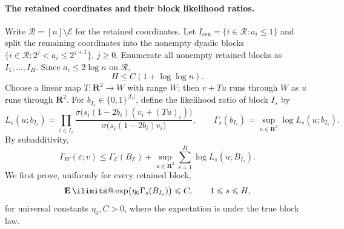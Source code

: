 \documentclass[11pt, letterpaper, hidelinks]{article}
\makeatletter
\renewcommand{\proofname}{\textit{\textbf{Proof}}}
\renewenvironment{proof}[1][\proofname]{\par\pushQED{\qed}\normalfont \topsep6\p@\@plus6\p@\relax\trivlist\item[\hskip\labelsep#1\@addpunct{}]\ignorespaces}{\popQED\endtrivlist\@endpefalse}
\newcommand{\proofsketchname}{\textit{\textbf{Proof sketch}}}
\newenvironment{proofsketch}
  {\begin{proof}[\proofsketchname]}
  {\end{proof}}
\newcommand{\R}{\mathbf R}
\newcommand{\1}{\mathbf 1}
\newcommand{\eps}{\varepsilon}
\renewcommand{\leq}{\leqslant}
\renewcommand{\geq}{\geqslant}
\newcommand{\E}{\operatorname*{\mathbf{E}}\ilimits@}
\theoremstyle{plain}
\theoremstyle{definition}
\makeatother
\begin{document}
\begin{proofsketch}
\paragraph{The retained coordinates and their block likelihood ratios.}
Write $\mathcal R=[n]\setminus\mathcal E$ for the retained coordinates.  Let
$I_{\mathrm{cen}}=\{i\in\mathcal R:a_i\leq1\}$ and split the remaining
coordinates into the nonempty dyadic blocks
$\{i\in\mathcal R:2^j<a_i\leq2^{j+1}\}$, $j\geq0$.  Enumerate all nonempty
retained blocks as $I_1,\ldots,I_H$.  Since $a_i\leq2\log n$ on $\mathcal R$,
\begin{equation}
\label{eq:d2-sketch-block-count}
H\leq C(1+\log\log n).
\end{equation}
Choose a linear map $T:\R^2\to W$ with range $W$; then $v+Tu$ runs through
$W$ as $u$ runs through $\R^2$.
For $b_{I_s}\in\{0,1\}^{|I_s|}$, define the likelihood ratio of block $I_s$ by
\[
L_s(u;b_{I_s})
=\prod_{i\in I_s}
\frac{\sigma\bigl(s_i(1-2b_i)(v_i+(Tu)_i)\bigr)}
{\sigma\bigl(s_i(1-2b_i)v_i\bigr)},
\qquad
\Gamma_s(b_{I_s})=\sup_{u\in\R^2}\log L_s(u;b_{I_s}).
\]
By subadditivity,
\begin{equation}
\label{eq:d2-sketch-margin-decomposition}
\Gamma_W(\eps;v)
\leq\Gamma_{\mathcal E}(B_{\mathcal E})
+\sup_{u\in\R^2}\sum_{s=1}^H\log L_s(u;B_{I_s}).
\end{equation}
We first prove, uniformly for every retained block,
\begin{equation}
\label{eq:d2-sketch-block-moment}
\E\exp\bigl(\eta_0\Gamma_s(B_{I_s})\bigr)\leq C,
\qquad 1\leq s\leq H,
\end{equation}
for universal constants $\eta_0,C>0$, where the expectation is under the true
block law.


\end{proofsketch}
\end{document}
